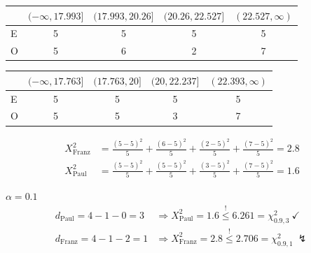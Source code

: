 \documentclass{beamer}
\begin{document}
\begin{frame}{\insertsection}
\begin{example}
	\begin{table}[htb]
	\center
	\begin{tabular}{l|cccc}
		& $(-\infty, 17.993]$ & $(17.993, 20.26]$ & $(20.26, 22.527]$ & $(22.527,\infty)$ \\
		\hline
		E & 5 & 5 & 5 & 5 \\
		O & 5 & 6 & 2 & 7 \\
	\end{tabular}
	\end{table}
\end{example}
\begin{example}
	\begin{table}[htb]
	\center
	\begin{tabular}{l|cccc}
	& $(-\infty, 17.763]$ & $(17.763, 20]$ & $(20, 22.237]$ & $(22.393,\infty)$ \\
	\hline
	E & 5 & 5 & 5 & 5 \\
	O & 5 & 5 & 3 & 7 \\
	\end{tabular}
	\end{table}
\end{example}
\end{frame}

\begin{frame}{\insertsection}
\begin{example}
	\begin{align*}
		X^2_{\text{Franz}} &= \frac{(5-5)^2}{5} + \frac{(6-5)^2}{5} + \frac{(2-5)^2}{5} + \frac{(7-5)^2}{5} = 2.8
		\\[1ex]
		X^2_{\text{Paul}} &= \frac{(5-5)^2}{5} + \frac{(5-5)^2}{5} + \frac{(3-5)^2}{5} + \frac{(7-5)^2}{5} = 1.6
	\end{align*}
\end{example}
\begin{example}[Entscheidung]
	$\alpha = 0.1$
	\begin{align*}
	d_\text{Paul} = 4-1-0 = 3 &\Rightarrow X^2_{\text{Paul}} = 1.6 \overset{!}{\leq} 6.261 = \chi^2_{0.9, 3} ~\checkmark
	\\
	d_\text{Franz} = 4-1-2 = 1 &\Rightarrow X^2_{\text{Franz}} = 2.8 \overset{!}{\leq} 2.706 = \chi^2_{0.9, 1} ~\lightning
	\end{align*}
\end{example}
\end{frame}
\end{document}
